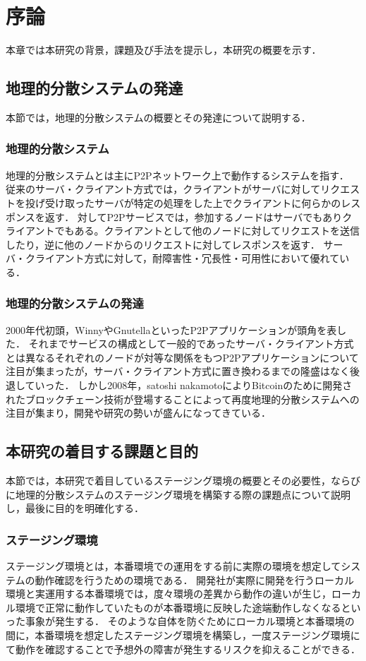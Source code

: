 \chapter{序論}
\label{introduction}

本章では本研究の背景，課題及び手法を提示し，本研究の概要を示す．

\section{地理的分散システムの発達}
\label{introduction:system-growth}
本節では，地理的分散システムの概要とその発達について説明する．

\subsection{地理的分散システム}
地理的分散システムとは主にP2Pネットワーク上で動作するシステムを指す．
従来のサーバ・クライアント方式では，クライアントがサーバに対してリクエストを投げ受け取ったサーバが特定の処理をした上でクライアントに何らかのレスポンスを返す．
対してP2Pサービスでは，参加するノードはサーバでもありクライアントでもある。クライアントとして他のノードに対してリクエストを送信したり，逆に他のノードからのリクエストに対してレスポンスを返す．
サーバ・クライアント方式に対して，耐障害性・冗長性・可用性において優れている．

\subsection{地理的分散システムの発達}
2000年代初頭，WinnyやGnutellaといったP2Pアプリケーションが頭角を表した．
それまでサービスの構成として一般的であったサーバ・クライアント方式とは異なるそれぞれのノードが対等な関係をもつP2Pアプリケーションについて注目が集まったが，サーバ・クライアント方式に置き換わるまでの隆盛はなく後退していった．
しかし2008年，satoshi nakamotoによりBitcoinのために開発されたブロックチェーン技術が登場することによって再度地理的分散システムへの注目が集まり，開発や研究の勢いが盛んになってきている．

\section{本研究の着目する課題と目的}
\label{introduction:issue-and-aim}
本節では，本研究で着目しているステージング環境の概要とその必要性，ならびに地理的分散システムのステージング環境を構築する際の課題点について説明し，最後に目的を明確化する．

\subsection{ステージング環境}
ステージング環境とは，本番環境での運用をする前に実際の環境を想定してシステムの動作確認を行うための環境である．
開発社が実際に開発を行うローカル環境と実運用する本番環境では，度々環境の差異から動作の違いが生じ，ローカル環境で正常に動作していたものが本番環境に反映した途端動作しなくなるといった事象が発生する．
そのような自体を防ぐためにローカル環境と本番環境の間に，本番環境を想定したステージング環境を構築し，一度ステージング環境にて動作を確認することで予想外の障害が発生するリスクを抑えることができる．

